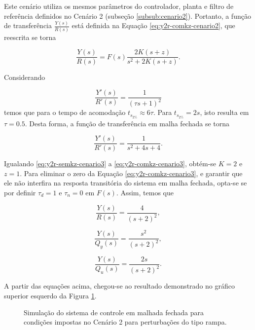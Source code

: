 Este cenário utiliza os mesmos parâmetros do controlador, planta e filtro de
referência definidos no Cenário 2 (subseção \ref{subsub:cenario2}). Portanto, a
função de transferência $\frac{Y(s)}{R(s)}$ está definida na Equação
\ref{eq:y2r-comkz-cenario2}, que reescrita se torna 

\begin{equation}
    \label{eq:y2r-comkz-cenario3}
    \frac{Y(s)}{R(s)} = F(s)\frac{2K(s + z)}{s^2 + 2K(s + z)}.
\end{equation}

Considerando

\begin{equation}
    \label{eq:y2r-com-polos-iguais-cenario3}
    \frac{Y'(s)}{R'(s)} = \frac{1}{(\tau s + 1)^2}
\end{equation}
temos que para o tempo de acomodação $t_{s_{2\%}} \approx 6\tau$. Para
$t_{s_{2\%}} = 2s$, isto resulta em $\tau = 0.5$. Desta forma, a função de
transferência em malha fechada se torna

\begin{equation}
    \label{eq:y2r-semkz-cenario3}
    \frac{Y'(s)}{R'(s)} = \frac{1}{s^2 + 4s + 4}.
\end{equation}

Igualando \ref{eq:y2r-semkz-cenario3} a \ref{eq:y2r-comkz-cenario3}, obtém-se $K
= 2$ e $z = 1$. Para eliminar o zero da Equação \ref{eq:y2r-comkz-cenario3}, e
garantir que ele não interfira na resposta transitória do sistema em malha
fechada, opta-se se por definir $\tau_{d} = 1$ e $\tau_{n} = 0$ em $F(s)$. Assim,
temos que

\begin{equation}
    \label{eq:y2r-solucionado-cenario3}
    \frac{Y(s)}{R(s)} = \frac{4}{(s + 2)^2},
\end{equation}

\begin{equation}
    \label{eq:y2qy-solucionado-cenario3}
    \frac{Y(s)}{Q_{y}(s)} = \frac{s^2}{(s + 2)^2},
\end{equation}

\begin{equation}
    \label{eq:y2qu-solucionado-cenario3}
    \frac{Y(s)}{Q_{u}(s)} = \frac{2s}{(s + 2)^2}.
\end{equation}

A partir das equações acima, chegou-se ao resultado demonstrado no gráfico
superior esquerdo da Figura \ref{fig:resultado-desafio1-cenario3}.

\begin{figure}[!ht]
    \caption{Simulação do sistema de controle em malhada fechada para condições
    impostas no Cenário 2 para perturbações do tipo rampa.}
    \vspace{-10pt}
    \hspace{-30pt}
    \label{fig:resultado-desafio1-cenario3}
    \begin{minipage}{\linewidth}
        
    \end{minipage}
\end{figure}

